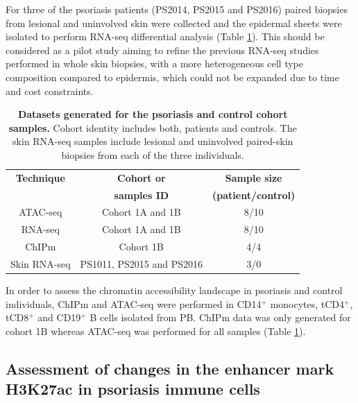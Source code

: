 For three of the psoriasis patients (PS2014, PS2015 and PS2016) paired biopsies from lesional and uninvolved skin were collected and the epidermal sheets were isolated to perform RNA-seq differential analysis (Table \ref{tab:Psoriasis_controls_datasets_per_sample}). This should be considered as a pilot study aiming to refine the previous RNA-seq studies performed in whole skin biopsies, with a more heterogeneous cell type composition compared to epidermis, which could not be expanded due to time and cost constraints.





\begin{table}[htbp]
\centering
\begin{tabular}{@{} c c c}
\toprule
\textbf{Technique} & \textbf{Cohort or}  & \textbf{Sample size}      \\
                   & \textbf{samples ID} & \textbf{(patient/control)} \\
\midrule
\midrule
ATAC-seq      & Cohort 1A and 1B &  8/10 \\
RNA-seq       & Cohort 1A and 1B &  8/10 \\
ChIPm         & Cohort 1B        &  4/4   \\
Skin RNA-seq  & PS1011, PS2015 and PS2016 & 3/0\\
\bottomrule
\end{tabular}
\medskip %
\caption[Datasets generated for the psoriasis and control cohort samples.]{\textbf{Datasets generated for the psoriasis and control cohort samples.} Cohort identity includes both, patients and controls. The skin RNA-seq samples include lesional and uninvolved paired-skin biopsies from each of the three individuals.}
\label{tab:Psoriasis_controls_datasets_per_sample}
\end{table}
\bigskip %

In order to assess the chromatin accessibility landscape in psoriasis and control individuals, ChIPm and ATAC-seq were performed in CD14$^+$ monocytes, tCD4$^+$, tCD8$^+$ and CD19$^+$ B cells isolated from PB. ChIPm data was only generated for cohort 1B whereas ATAC-seq was performed for all samples (Table \ref{tab:Psoriasis_controls_datasets_per_sample}).


\subsection{Assessment of changes in the enhancer mark H3K27ac in psoriasis immune cells}

